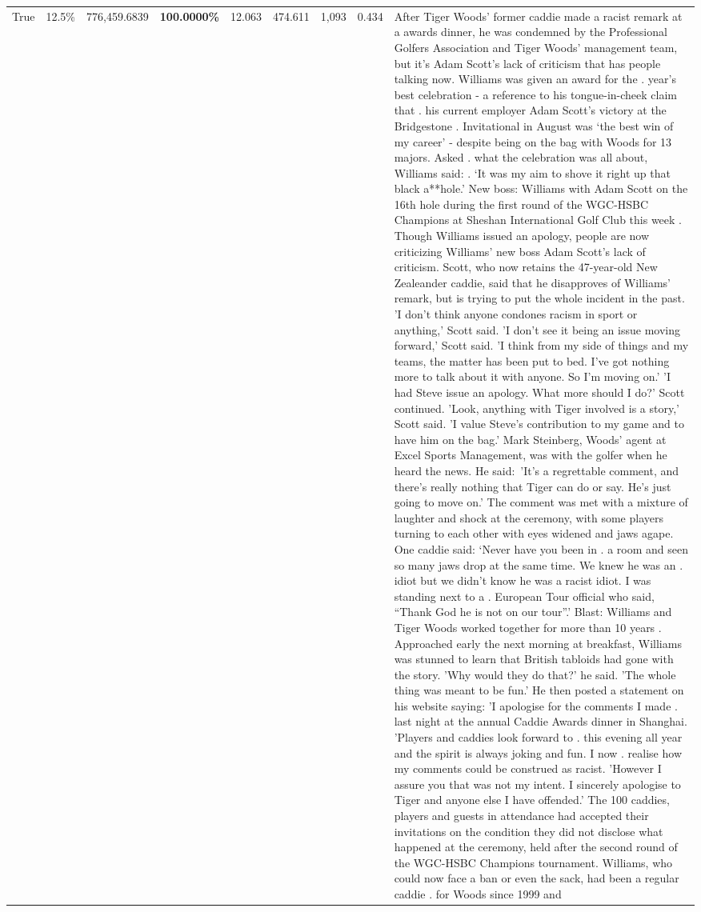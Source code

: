 \begin{table}[H]
\begin{tabular}{lllrlllll}
True & 12.5\% & 776,459.6839 & \bfseries \color{red} 100.0000\% & 12.063 & 474.611 & 1,093 & 0.434 & After Tiger Woods' former caddie made a racist remark at a awards dinner, he was condemned by the Professional Golfers Association and Tiger Woods' management team, but it's Adam Scott's lack of criticism that has people talking now. Williams was given an award for the . year’s best celebration - a reference to his tongue-in-cheek claim that . his current employer Adam Scott’s victory at the Bridgestone . Invitational in August was ‘the best win of my career’ - despite being on the bag with Woods for 13 majors. Asked . what the celebration was all about, Williams said: . ‘It was my aim to shove it right up that black a**hole.’ New boss: Williams with Adam Scott  on the 16th hole during the first round of the WGC-HSBC Champions at Sheshan International Golf Club this week . Though Williams issued an apology, people are now criticizing Williams' new boss Adam Scott's lack of criticism. Scott, who now retains the 47-year-old New Zealeander caddie, said that he disapproves of Williams' remark, but is trying to put the whole incident in the past. 'I don't think anyone condones racism in sport or anything,' Scott said. 'I don't see it being an issue moving forward,' Scott said. 'I think from my side of things and my teams, the matter has been put to bed. I've got nothing more to talk about it with anyone. So I'm moving on.' 'I had Steve issue an apology. What more should I do?' Scott continued. 'Look, anything with Tiger involved is a story,' Scott said. 'I value Steve's contribution to my game and to have him on the bag.' Mark Steinberg, Woods' agent at Excel Sports Management, was with the golfer when he heard the news. He said: 'It's a regrettable comment, and there's really nothing that Tiger can do or say. He's just going to move on.' The comment was met with a mixture of laughter and shock at the ceremony, with some players turning to each other with eyes widened and jaws agape. One caddie said: ‘Never have you been in . a room and seen so many jaws drop at the same time. We knew he was an . idiot but we didn’t know he was a racist idiot. I was standing next to a . European Tour official who said, “Thank God he is not on our tour”.’ Blast: Williams and Tiger Woods worked together for more than 10 years . Approached early the next morning at breakfast, Williams was stunned to learn that British tabloids had gone with the story. 'Why would they do that?' he said. 'The whole thing was meant to be fun.' He then posted a statement on his website saying: 'I apologise for the comments I made . last night at the annual Caddie Awards dinner in Shanghai. 'Players and caddies look forward to . this evening all year and the spirit is always joking and fun. I now . realise how my comments could be construed as racist. 'However I assure you that was not my intent. I sincerely apologise to Tiger and anyone else I have offended.' The 100 caddies, players and guests in attendance had accepted their invitations on the condition they did not disclose what happened at the ceremony, held after the second round of the WGC-HSBC Champions tournament. Williams, who could now face a ban or even the sack, had been a regular caddie . for Woods since 1999 and 
\end{tabular}
\end{table}
